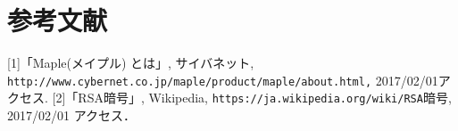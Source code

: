 \section{参考文献}
[1]「Maple(メイプル) とは」, サイバネット, \verb|http://www.cybernet.co.jp/maple/product/maple/about.html,| 2017/02/01アクセス.
[2]「RSA暗号」, Wikipedia, \verb|https://ja.wikipedia.org/wiki/RSA|暗号, 2017/02/01 アクセス．

